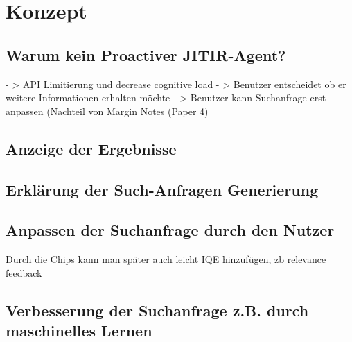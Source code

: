 \section{Konzept}
 \subsection{Warum kein Proactiver JITIR-Agent?}
 	- > API Limitierung und decrease cognitive load 
	- > Benutzer entscheidet ob er weitere Informationen erhalten möchte
	- > Benutzer kann Suchanfrage erst anpassen (Nachteil von Margin Notes (Paper 4)
 \subsection{Anzeige der Ergebnisse}
 \subsection{Erklärung der Such-Anfragen Generierung}
 \subsection{Anpassen der Suchanfrage durch den Nutzer}
 Durch die Chips kann man später auch leicht IQE hinzufügen, zb relevance feedback
 \subsection{Verbesserung der Suchanfrage z.B. durch maschinelles Lernen}
